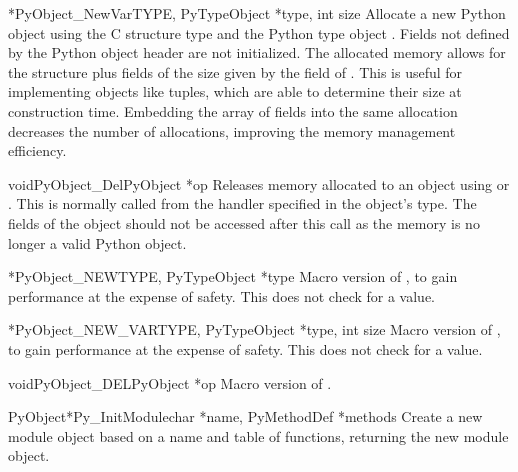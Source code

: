 \begin{cfuncdesc}{*}{PyObject_NewVar}{TYPE, PyTypeObject *type,
                                                int size}
  Allocate a new Python object using the C structure type 
  and the Python type object .  Fields not defined by the
  Python object header are not initialized.  The allocated memory
  allows for the  structure plus  fields of the
  size given by the  field of .  This is
  useful for implementing objects like tuples, which are able to
  determine their size at construction time.  Embedding the array of
  fields into the same allocation decreases the number of allocations,
  improving the memory management efficiency.
\end{cfuncdesc}

\begin{cfuncdesc}{void}{PyObject_Del}{PyObject *op}
  Releases memory allocated to an object using
   or .  This
  is normally called from the  handler specified in
  the object's type.  The fields of the object should not be accessed
  after this call as the memory is no longer a valid Python object.
\end{cfuncdesc}

\begin{cfuncdesc}{*}{PyObject_NEW}{TYPE, PyTypeObject *type}
  Macro version of , to gain performance at
  the expense of safety.  This does not check  for a \NULL{}
  value.
\end{cfuncdesc}

\begin{cfuncdesc}{*}{PyObject_NEW_VAR}{TYPE, PyTypeObject *type,
                                                int size}
  Macro version of , to gain performance
  at the expense of safety.  This does not check  for a
  \NULL{} value.
\end{cfuncdesc}

\begin{cfuncdesc}{void}{PyObject_DEL}{PyObject *op}
  Macro version of .
\end{cfuncdesc}

\begin{cfuncdesc}{PyObject*}{Py_InitModule}{char *name,
                                            PyMethodDef *methods}
  Create a new module object based on a name and table of functions,
  returning the new module object.
\end{cfuncdesc}


